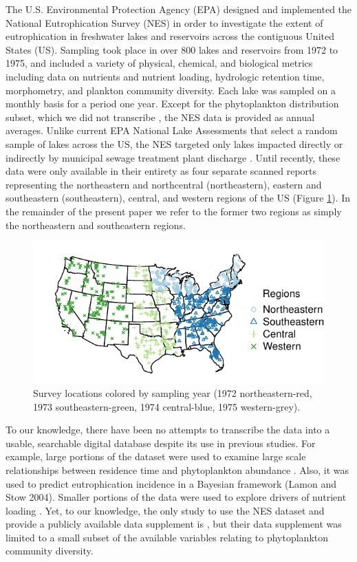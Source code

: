 \documentclass[journal abbreviations, manuscript]{copernicus}
\begin{document}
The U.S. Environmental Protection Agency (EPA) designed and implemented the National Eutrophication Survey (NES) in order to investigate the extent of eutrophication in freshwater lakes and reservoirs across the contiguous United States (US). Sampling took place in over 800 lakes and reservoirs from 1972 to 1975, and included a variety of physical, chemical, and biological metrics including data on nutrients and nutrient loading, hydrologic retention time, morphometry, and plankton community diversity. Each lake was sampled on a monthly basis for a period one year. Except for the phytoplankton distribution subset, which we did not transcribe \citep[see ][]{stomp2011large}, the NES data is provided as annual averages. Unlike current EPA National Lake Assessments that select a random sample of lakes across the US, the NES  targeted only lakes impacted directly or indirectly by municipal sewage treatment plant discharge \citep{nla-methods, nes-methods}. Until recently, these data were only available in their entirety as four separate scanned reports representing the northeastern and northcentral  (northeastern), eastern and southeastern (southeastern), central, and western regions of the US (Figure \ref{fig:points_regions}). In the remainder of the present paper we refer to the former two regions as simply the northeastern and southeastern regions.

\begin{figure}[t]
  \includegraphics[width=12cm]{points_regions-crop.pdf}
  \caption{Survey locations colored by sampling year (1972 northeastern-red, 1973 southeastern-green, 1974 central-blue, 1975 western-grey).}\label{fig:points_regions}
\end{figure}

To our knowledge, there have been no attempts to transcribe the data into a usable, searchable digital database despite its use in previous studies.   For example, large portions of the dataset were used to examine large scale relationships between residence time and phytoplankton abundance \citep{soballe1987large}. Also, it was used to predict eutrophication incidence in a Bayesian framework (Lamon and Stow 2004). Smaller portions of the data were used to explore drivers of nutrient loading \citep{stomp2011large,Brettreviewreassessmentlake2007}. Yet, to our knowledge, the only study to use the NES dataset and provide a publicly available data supplement is \citet{stomp2011large}, but their data supplement was limited to a small subset of the available variables relating to phytoplankton community diversity. 
\end{document}
